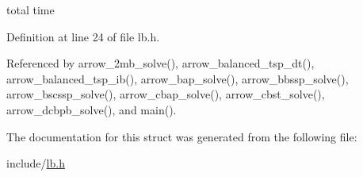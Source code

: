 total time 

Definition at line 24 of file lb.h.

Referenced by arrow\_\-2mb\_\-solve(), arrow\_\-balanced\_\-tsp\_\-dt(), arrow\_\-balanced\_\-tsp\_\-ib(), arrow\_\-bap\_\-solve(), arrow\_\-bbssp\_\-solve(), arrow\_\-bscssp\_\-solve(), arrow\_\-cbap\_\-solve(), arrow\_\-cbst\_\-solve(), arrow\_\-dcbpb\_\-solve(), and main().

The documentation for this struct was generated from the following file:\begin{CompactItemize}
\item 
include/\hyperlink{lb_8h}{lb.h}\end{CompactItemize}
